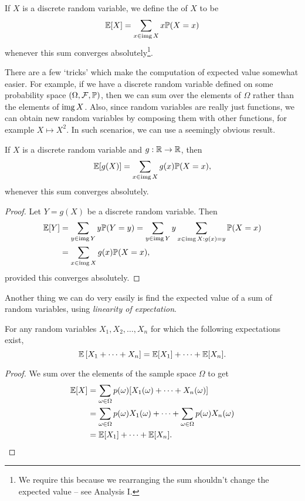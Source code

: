 \documentclass[a4paper]{scrartcl}
\begin{document}
\begin{definition}
	If $X$ is a discrete random variable, we define the  of $X$ to be
	$$
\mathbb{E}[X] = \sum_{x \in \operatorname{img} X} x \mathbb{P}(X = x)
	$$
	whenever this sum converges absolutely\footnote{We require this because we rearranging the sum shouldn't change the expected value -- see Analysis I.}.
\end{definition}

There are a few `tricks' which make the computation of expected value somewhat easier. For example, if we have a discrete random variable defined on some probability space $(\Omega, \mathcal{F}, \mathbb{P})$, then we can sum over the elements of $\Omega$ rather than the elements of $\operatorname{img} X$.
Also, since random variables are really just functions, we can obtain new random variables by composing them with other functions, for example $X \mapsto X^2$. In such scenarios, we can use a seemingly obvious result.

\begin{theorem}
	If $X$ is a discrete random variable and $g: \mathbb{R} \rightarrow \mathbb{R}$, then
	$$
\mathbb{E}[g(X)] = \sum_{x \in \operatorname{img} X} g(x) \mathbb{P}(X = x),
	$$
	whenever this sum converges absolutely.
\end{theorem}
\begin{proof}
	Let $Y = g(X)$ be a discrete random variable. Then
	\begin{align*}
		\mathbb{E}[Y] &= \sum_{y \in \operatorname{img} Y} y \mathbb{P}(Y = y) = \sum_{y \in \operatorname{img} Y} y \sum_{x \in \operatorname{img} X : g(x) = y} \mathbb{P}(X = x)  \\
		&= \sum_{x \in \operatorname{img} X} g(x) \mathbb{P}(X = x),
	\end{align*}
	provided this converges absolutely.
\end{proof}

Another thing we can do very easily is find the expected value of a sum of random variables, using \emph{linearity of expectation}.

\begin{theorem}
	For any random variables $X_1, X_2, \dots, X_n$ for which the following expectations exist,
	$$
\mathbb{E}\left[X_1 + \cdots + X_n\right]= \mathbb{E}[X_1] + \cdots + \mathbb{E}[X_n].
	$$
\end{theorem}
\begin{proof}
	We sum over the elements of the sample space $\Omega$ to get
	\begin{align*}
		\mathbb{E}[X] &= \sum_{\omega \in \Omega} p(\omega)[X_1(\omega) + \cdots + X_n(\omega)]\\
		&= \sum_{\omega \in \Omega} p(\omega) X_1(\omega) + \cdots + \sum_{\omega \in \Omega} p(\omega) X_n(\omega)\\&= \mathbb{E}[X_1] + \cdots + \mathbb{E}[X_n].
	\end{align*}
\end{proof}
\end{document}
